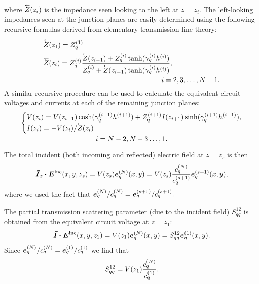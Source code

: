 where $\Zleft(z_i)$ is the impedance seen looking to the left at
$z=z_i$.  The left-looking impedances seen at the junction planes
are easily determined using the following recursive
formulas derived from elementary transmission line theory:
\begin{subequations}
  \begin{align}
    &\Zleft(z_1) = Z_{q}\one \\
    &\Zleft(z_i) = Z_{q}\eye 
    \frac%
    {\Zleft(z_{i-1}) + Z_{q}\eye \tanh(\gamma_{q}\eye h\eye)}%
    {Z_{q}\eye + \Zleft(z_{i-1})\tanh(\gamma_{q}\eye h\eye)}, \notag \\
    & \mkern300mu i = 2,3,\ldots,N-1.
  \end{align}
\end{subequations}
A similar recursive procedure can be used to calculate the 
equivalent circuit voltages and currents at each of the remaining
junction planes:
\begin{multline}
  \left\{
    \begin{array}{@{}l@{}}
      \displaystyle
      V(z_i) = V(z_{i+1}) \cosh (\gamma_{q}\epw h\epw)
      + Z_q\epw
      I(z_{i+1}) \sinh ( \gamma_{q}\epw h\epw ), \\
      \displaystyle
      I(z_i) = -V(z_i)/\Zleft(z_i)
    \end{array}
  \right.
  \\
  i = N-2,N-3\ldots,1. 
  \label{eq:recurseleft}
\end{multline}

The total incident (both incoming and reflected) electric field at
$z=z_s$ is then
\begin{equation}
  \boldsymbol{\bar{I}}_z \boldsymbol{\cdot} \boldsymbol{E}^{\text{inc}}(x,y,z_s) = V(z_s) \boldsymbol{e}_q^{(N)}(x,y)
  = V(z_s) \frac{c_q^{(N)}}{c_q^{(s+1)}} \boldsymbol{e}_q^{(s+1)}(x,y),
\end{equation}
where we used the fact that $\boldsymbol{e}_q^{(N)} / c_q^{(N)} = \boldsymbol{e}_q^{(s+1)} / c_q^{(s+1)}.$

The partial transmission scattering parameter (due to the incident
field) $S^{12}_{qq}$ is obtained from the equivalent circuit voltage
at $z=z_1$:
\begin{equation}
  \boldsymbol{\bar{I}} \boldsymbol{\cdot} \boldsymbol{E}^{\text{inc}}(x,y,z_{1}) = V(z_{1}) \boldsymbol{e}_q^{(N)}(x,y) 
  = S^{12}_{qq} \boldsymbol{e}_q^{(1)}(x,y).
\end{equation}
Since $\boldsymbol{e}_q^{(N)} / c_q^{(N)} = \boldsymbol{e}_q^{(1)} / c_q^{(1)}$ we find that
\begin{equation}
  S^{12}_{qq} = V(z_{1}) \frac{c_q^{(N)}}{c_q^{(1)}}.
\end{equation}

